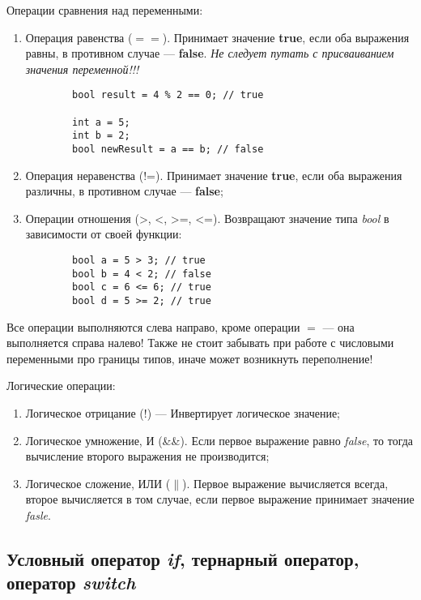 Операции сравнения над переменными:
\begin{enumerate}
    \item Операция равенства ($==$). Принимает значение \textbf{true}, если оба выражения равны, в противном случае --- \textbf{false}. \textit{Не следует путать с присваиванием значения переменной!!!}

    \begin{lstlisting}
        bool result = 4 % 2 == 0; // true

        int a = 5;
        int b = 2;
        bool newResult = a == b; // false
    \end{lstlisting}

    \item Операция неравенства (!=). Принимает значение \textbf{true}, если оба выражения различны, в противном случае --- \textbf{false};
    \item Операции отношения (>, <, >=, <=). Возвращают значение типа \textit{bool} в зависимости от своей функции:

    \begin{lstlisting}
        bool a = 5 > 3; // true
        bool b = 4 < 2; // false
        bool c = 6 <= 6; // true
        bool d = 5 >= 2; // true
    \end{lstlisting}
\end{enumerate}

Все операции выполняются слева направо, кроме операции $=$ --- она выполняется справа налево! Также не стоит забывать при работе с числовыми переменными про границы типов, иначе может возникнуть переполнение!

Логические операции:

\begin{enumerate}
    \item Логическое отрицание (!) --- Инвертирует логическое значение;
    \item Логическое умножение, И (\&\&). Если первое выражение равно \textit{false}, то тогда вычисление второго выражения не производится;
    \item Логическое сложение, ИЛИ ($\parallel$). Первое выражение вычисляется всегда, второе вычисляется в том случае, если первое выражение принимает значение \textit{fasle}.
\end{enumerate}

\subsection{Условный оператор \textit{if}, тернарный оператор, оператор \textit{switch}}
